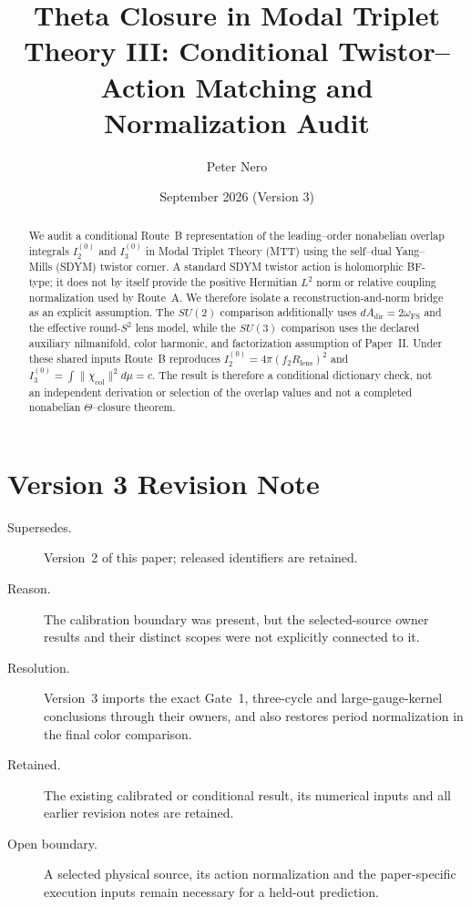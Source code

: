 \documentclass[11pt]{article}
\title{Theta Closure in Modal Triplet Theory III:
Conditional Twistor--Action Matching and Normalization Audit}
\author{Peter Nero}
\date{September 2026 (Version 3)}
\begin{document}
\maketitle

\begin{abstract}
We audit a conditional Route~B representation of the leading--order nonabelian
overlap integrals $I_2^{(0)}$ and $I_3^{(0)}$ in Modal Triplet Theory (MTT)
using the self--dual Yang--Mills (SDYM) twistor corner. A standard SDYM
twistor action is holomorphic BF-type; it does not by itself provide the
positive Hermitian $L^2$ norm or relative coupling normalization used by
Route~A. We therefore isolate a reconstruction-and-norm bridge as an explicit
assumption. The $SU(2)$ comparison additionally uses
$dA_{\mathrm{dir}}=2\omega_{\mathrm{FS}}$ and the effective round-$S^2$ lens
model, while the $SU(3)$ comparison uses the declared auxiliary nilmanifold,
color harmonic, and factorization assumption of Paper~II. Under these shared
inputs Route~B reproduces
$I_2^{(0)}=4\pi(f_2R_{\mathrm{lens}})^2$ and
$I_3^{(0)}=\int\|\chi_{\mathrm{col}}\|^2d\mu=c$. The result is therefore a
conditional dictionary check, not an independent derivation or selection of
the overlap values and not a completed nonabelian $\Theta$--closure theorem.
\end{abstract}

\section*{Version 3 Revision Note}
\label{sec:revision-v3}
\begin{description}
\item[Supersedes.] Version~2 of this paper; released identifiers are retained.
\item[Reason.] The calibration boundary was present, but the selected-source
owner results and their distinct scopes were not explicitly connected to it.
\item[Resolution.] Version~3 imports the exact Gate~1, three-cycle and
large-gauge-kernel conclusions through their owners, and also restores period normalization in the final color comparison.
\item[Retained.] The existing calibrated or conditional result, its numerical
inputs and all earlier revision notes are retained.
\item[Open boundary.] A selected physical source, its action normalization and
the paper-specific execution inputs remain necessary for a held-out prediction.
\end{description}
\end{document}

